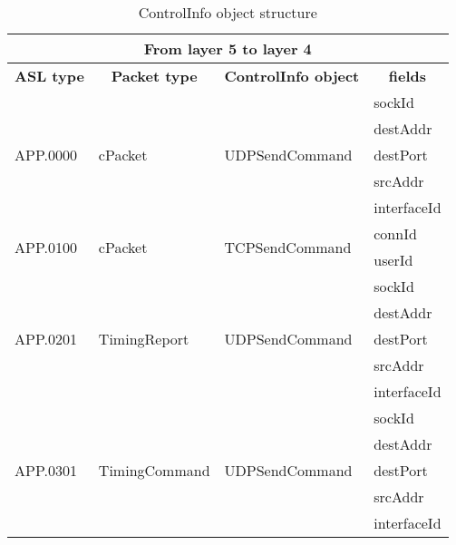 \begin{table} [ppp]
\centering
\ttfamily
\footnotesize
\caption{ControlInfo object structure}
\label{tab:from5-to4}
\begin{tabular}{|l|l|l|l|}
\hline
\multicolumn{4}{|c|}{\normalfont\textbf{From layer 5 to layer 4}}	\\
\hline
\multicolumn{1}{|c|}{\normalfont\textbf{ASL type}}	&\multicolumn{1}{c|}{\normalfont\textbf{Packet type}}	&\multicolumn{1}{c|}{\normalfont\textbf{ControlInfo object}}		&\multicolumn{1}{c|}{\normalfont\textbf{fields}}\\
\hline
\multirow{5}{*}{APP.0000}	&\multirow{5}{*}{cPacket}		&\multirow{5}{*}{UDPSendCommand}	&sockId			\\
					&						&								&destAddr	\\
					&						&								&destPort	\\
					&						&								&srcAddr	\\
					&						&								&interfaceId	\\
\hline
\multirow{2}{*}{APP.0100}	&\multirow{2}{*}{cPacket}		&\multirow{2}{*}{TCPSendCommand}	&connId			\\
					&						&								&userId	\\
\hline
\multirow{5}{*}{APP.0201}	&\multirow{5}{*}{TimingReport}	&\multirow{5}{*}{UDPSendCommand}	&sockId			\\
					&						&								&destAddr	\\
					&						&								&destPort	\\
					&						&								&srcAddr	\\
					&						&								&interfaceId	\\
\hline
\multirow{5}{*}{APP.0301}	&\multirow{5}{*}{TimingCommand}	&\multirow{5}{*}{UDPSendCommand}	&sockId			\\
					&							&								&destAddr	\\
					&							&								&destPort	\\
					&							&								&srcAddr	\\
					&							&								&interfaceId	\\
\hline
\end{tabular}
\end{table}

